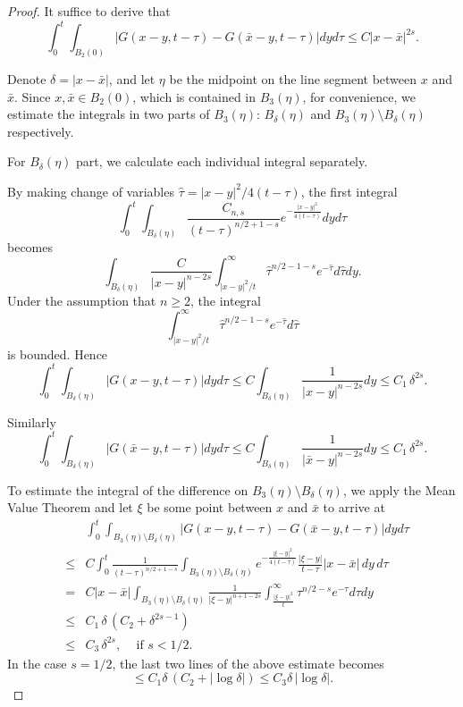 \documentclass[12pt]{article}
\theoremstyle{remark}
\numberwithin{equation}{section}
\begin{document}
\begin{proof}

It suffice to derive that
\begin{equation}
\int_{0}^t  \int_{B_2(0)} | G(x-y, t-\tau) - G(\bar{x}-y, t-\tau) | d y d \tau  \leq C |x-\bar{x}|^{2s}.
\label{3.1}
\end{equation}

Denote $\delta = |x-\bar{x}|$, and let $\eta$ be the midpoint on the line segment between $x$ and $\bar{x}$. Since $x, \bar{x} \in B_2(0)$, which is contained in $B_3(\eta)$, for convenience, we estimate the integrals in two parts of $B_3(\eta)$:  $B_\delta (\eta)$ and $B_3(\eta) \setminus B_\delta (\eta)$ respectively.

For $B_\delta (\eta)$ part, we calculate each individual integral separately.


By making change of variables $ \hat{\tau} = |x-y|^2/4(t-\tau)$,
the first integral
$$\int_0^t \int_{B_\delta (\eta)} \frac{C_{n,s}}{(t-\tau)^{n/2+1-s}} e^{-\frac{|x-y|^2}{4(t-\tau)}} dy d\tau$$
becomes
$$ \int_{B_\delta (\eta)} \frac{C}{|x-y|^{n-2s}} \int_{|x-y|^2/t}^\infty \hat{\tau}^{n/2-1-s} e^{-\hat{\tau}} d \hat{\tau} d y.$$
Under the assumption that $n \geq 2$, the integral
$$ \int_{|x-y|^2/t}^\infty \hat{\tau}^{n/2-1-s} e^{-\hat{\tau}} d \hat{\tau} $$
is bounded. Hence
\begin{equation}
\int_0^t  \int_{B_\delta (\eta)} | G(x-y, t-\tau)| d y d \tau \leq C \int_{B_\delta (\eta)} \frac{1}{|x-y|^{n-2s}} d y \leq C_1 \, \delta^{2s}.
\label{3.5}
\end{equation}

Similarly
\begin{equation}
\int_0^t  \int_{B_\delta (\eta)} | G(\bar{x}-y, t-\tau)| d y d \tau \leq C \int_{B_\delta (\eta)} \frac{1}{|\bar{x}-y|^{n-2s}} d y \leq C_1 \, \delta^{2s}.
\label{3.6}
\end{equation}

To estimate the integral of the difference on $B_3(\eta) \setminus B_\delta (\eta)$, we apply the Mean Value Theorem and let $\xi$ be some point between $x$ and $\bar{x}$ to arrive at
\begin{eqnarray}
& &\int_0^t  \int_{B_3(\eta) \setminus B_\delta (\eta)} | G(x-y, t-\tau) - G(\bar{x}-y, t-\tau) | d y d \tau \nonumber \\
& \leq & C \int_0^t \frac{1}{(t-\tau)^{n/2+1-s}} \int_{B_3(\eta) \setminus B_\delta (\eta)}  e^{-\frac{|\xi-y|^2}{4(t-\tau)}} \frac{|\xi-y|}{t-\tau} |x - \bar{x}| \, d y \, d \tau \nonumber \\
& = & C |x-\bar{x}| \int_{B_3(\eta) \setminus B_\delta (\eta)} \frac{1}{|\xi -y|^{n+1-2s}} \int_{\frac{|\xi -y|^2}{t}}^\infty \tau^{n/2-s} e^{-\tau} d \tau d y \nonumber \\
& \leq & C_1 \, \delta \, ( C_2 + \delta^{2s-1}) \nonumber \\
& \leq & C_3 \, \delta^{2s}, \;\; \; \mbox{ if } s < 1/2.
\label{3.7}
\end{eqnarray}
In the case $s = 1/2$, the last two lines of the above estimate becomes
$$ \leq C_1 \delta \, ( C_2 + |\log \delta |) \leq C_3 \delta \, |\log \delta|.$$


\end{proof}
\end{document}
